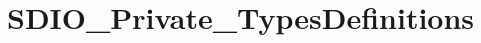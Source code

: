 \hypertarget{group___s_d_i_o___private___types_definitions}{\section{S\-D\-I\-O\-\_\-\-Private\-\_\-\-Types\-Definitions}
\label{group___s_d_i_o___private___types_definitions}
}
